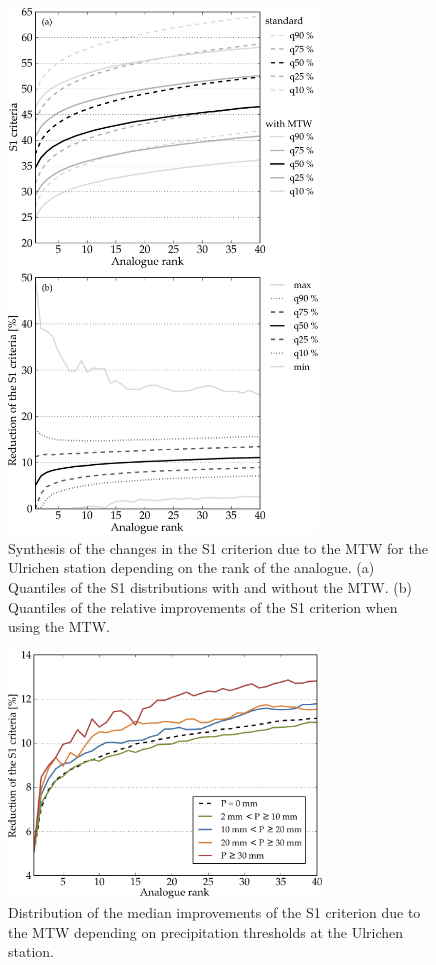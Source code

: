 \documentclass[hess, manuscript]{copernicus}
\begin{document}
	\begin{figure}[htb]
		\begin{center}
			\includegraphics[width=8.2cm]{figures/changes_S1_value_and_gain.pdf}
		\end{center}
		\caption{Synthesis of the changes in the S1 criterion due to the MTW for the Ulrichen station depending on the rank of the analogue. (a) Quantiles of the S1 distributions with and without the MTW. (b) Quantiles of the relative improvements of the S1 criterion when using the MTW.}
		\label{fig:changes_S1}
	\end{figure}
	
	\begin{figure}[htb]
		\begin{center}
			\includegraphics[width=8.3cm]{figures/changes_S1_precip_threshold.pdf}
		\end{center}
		\caption{Distribution of the median improvements of the S1 criterion due to the MTW depending on precipitation thresholds at the Ulrichen station.}
		\label{fig:changes_S1_precip_threshold}
	\end{figure}
	
\end{document}
